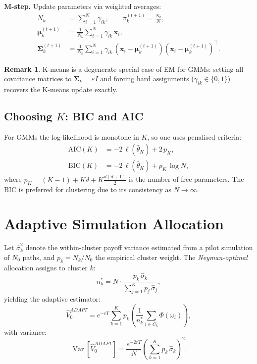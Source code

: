 \documentclass[12pt, a4paper]{report}
\theoremstyle{definition}
\newtheorem{remark}{Remark}[chapter]
\newcommand{\Var}{\operatorname{Var}}
\begin{document}
\textbf{M-step.}  Update parameters via weighted averages:
\begin{align}
    N_k &= \sum_{i=1}^N \gamma_{ik}, \qquad
    \pi_k^{(t+1)} = \frac{N_k}{N}, \label{eq:em-pi}\\
    \boldsymbol{\mu}_k^{(t+1)} &= \frac{1}{N_k}
    \sum_{i=1}^N \gamma_{ik}\,\mathbf{x}_i, \label{eq:em-mu}\\
    \boldsymbol{\Sigma}_k^{(t+1)} &= \frac{1}{N_k}
    \sum_{i=1}^N \gamma_{ik}\,
    (\mathbf{x}_i - \boldsymbol{\mu}_k^{(t+1)})
    (\mathbf{x}_i - \boldsymbol{\mu}_k^{(t+1)})^\top.
    \label{eq:em-sigma}
\end{align}

\begin{remark}
K-means is a degenerate special case of EM for GMMs: setting all
covariance matrices to $\boldsymbol{\Sigma}_k = \varepsilon I$ and
forcing hard assignments ($\gamma_{ik} \in \{0,1\}$) recovers the
K-means update exactly.
\end{remark}

\subsection{Choosing $K$: BIC and AIC}

For GMMs the log-likelihood is monotone in $K$, so one uses penalised
criteria:
\begin{align}
    \mathrm{AIC}(K) &= -2\,\ell(\hat{\theta}_K) + 2\,p_K,
    \label{eq:aic}\\
    \mathrm{BIC}(K) &= -2\,\ell(\hat{\theta}_K) + p_K\,\log N,
    \label{eq:bic}
\end{align}
where $p_K = (K-1) + Kd + K\frac{d(d+1)}{2}$ is the number of free
parameters.  The BIC is preferred for clustering due to its consistency
as $N \to \infty$.

\section{Adaptive Simulation Allocation}
\label{sec:adaptive-allocation}

Let $\hat{\sigma}_k^2$ denote the within-cluster payoff variance
estimated from a pilot simulation of $N_0$ paths, and $p_k = N_k/N_0$
the empirical cluster weight.  The \emph{Neyman-optimal} allocation
assigns to cluster $k$:
\begin{equation}
    n_k^* = N \cdot \frac{p_k\,\hat{\sigma}_k}
    {\sum_{j=1}^K p_j\,\hat{\sigma}_j},
    \label{eq:neyman-cluster}
\end{equation}
yielding the adaptive estimator:
\begin{equation}
    \hat{V}_0^{ADAPT} = e^{-rT} \sum_{k=1}^{K} p_k
    \left(\frac{1}{n_k^*}\sum_{i \in C_k} \Phi(\omega_i)\right),
    \label{eq:adaptive-estimator}
\end{equation}
with variance:
\begin{equation}
    \Var\!\left[\hat{V}_0^{ADAPT}\right]
    = \frac{e^{-2rT}}{N}
    \left(\sum_{k=1}^{K} p_k\,\hat{\sigma}_k\right)^2.
    \label{eq:adaptive-variance}
\end{equation}
\end{document}
